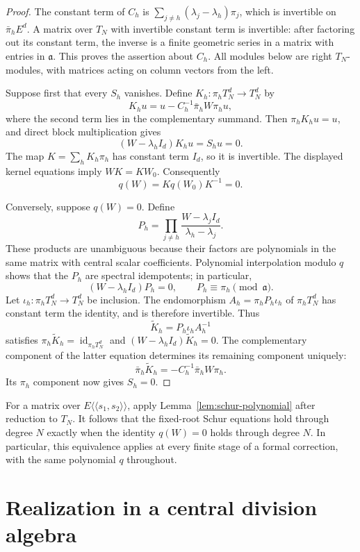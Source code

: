 \documentclass[11pt]{article}
\theoremstyle{definition}
\theoremstyle{remark}
\numberwithin{equation}{section}
\begin{document}
\begin{proof}
The constant term of $C_h$ is
$\sum_{j\ne h}(\lambda_j-\lambda_h)\pi_j$, which is invertible on
$\bar\pi_h E^d$. A matrix over $T_N$ with invertible constant term is
invertible: after factoring out its constant term, the inverse is a
finite geometric series in a matrix with entries in $\mathfrak a$.
This proves the assertion about $C_h$. All modules below are right
$T_N$-modules, with matrices acting on column vectors from the left.

Suppose first that every $S_h$ vanishes. Define
$K_h:\pi_hT_N^d\longrightarrow T_N^d$ by
\[
  K_hu=u-C_h^{-1}\bar\pi_hW\pi_hu,
\]
where the second term lies in the complementary summand. Then
$\pi_hK_hu=u$, and direct block multiplication gives
\[
  (W-\lambda_h I_d)K_hu=S_hu=0.
\]
The map $K=\sum_hK_h\pi_h$ has constant term $I_d$, so it is
invertible. The displayed kernel equations imply
$WK=KW_0$. Consequently
\[
  q(W)=Kq(W_0)K^{-1}=0.
\]

Conversely, suppose $q(W)=0$. Define
\[
  P_h=\prod_{j\ne h}
       \frac{W-\lambda_j I_d}{\lambda_h-\lambda_j}.
\]
These products are unambiguous because their factors are polynomials
in the same matrix with central scalar coefficients. Polynomial
interpolation modulo $q$ shows that the $P_h$ are spectral
idempotents; in particular,
\[
  (W-\lambda_h I_d)P_h=0,
  \qquad P_h\equiv\pi_h\pmod{\mathfrak a}.
\]
Let $\iota_h:\pi_hT_N^d\longrightarrow T_N^d$ be inclusion. The
endomorphism $A_h=\pi_hP_h\iota_h$ of $\pi_hT_N^d$ has constant
term the identity, and is therefore invertible. Thus
\[
  \widetilde K_h=P_h\iota_hA_h^{-1}
\]
satisfies
$\pi_h\widetilde K_h=\operatorname{id}_{\pi_hT_N^d}$ and
$(W-\lambda_h I_d)\widetilde K_h=0$. The complementary component
of the latter equation determines its remaining component uniquely:
\[
  \bar\pi_h\widetilde K_h
    =-C_h^{-1}\bar\pi_hW\pi_h.
\]
Its $\pi_h$ component now gives $S_h=0$.
\end{proof}

For a matrix over $E\langle\!\langle s_1,s_2\rangle\!\rangle$,
apply Lemma~\ref{lem:schur-polynomial} after reduction to $T_N$.
It follows that the fixed-root Schur equations hold through degree
$N$ exactly when the identity $q(W)=0$ holds through degree $N$.
In particular, this equivalence applies at every finite stage of a
formal correction, with the same polynomial $q$ throughout.

\section{Realization in a central division algebra}
\label{sec:division-realization}
\end{document}
